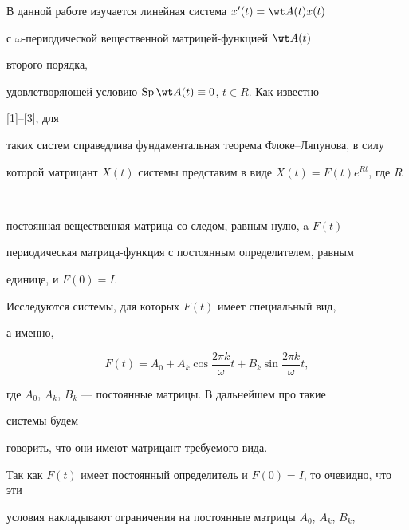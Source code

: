 

\maketitle 


\label{begin} 


 


 


 


В данной работе изучается линейная система $x'(t)=\wt A(t)x(t)$ 


с $\omega$-периодической вещественной мат\-ри\-цей-функцией $\wt A(t)$


второго порядка, 


удовлетворяющей условию $\SP\wt A(t)\equiv0$, $t\in R$. Как известно 


[1]--[3], для 


таких систем справедлива фундаментальная теорема Флоке--Ляпунова, в силу 


которой матрицант $X(t)$ системы представим в виде $X(t)=F(t)e^{Rt}$, где $R$ 


--- 


постоянная вещественная матрица со следом, равным нулю, a $F(t)$ --- 


периодическая матрица-функция с постоянным определителем, равным 


единице, и $F(0)=I$. 


 


Исследуются системы, для которых $F(t)$ имеет специальный вид, 


а именно, 


$$ 


F(t)=A_0+A_k\cos\frac{2\pi k}{\omega}t+ 


B_k\sin\frac{2\pi k}{\omega}t, 


$$ 


где $A_0$, $A_k$, $B_k$ --- постоянные матрицы. В дальнейшем про такие 


системы будем 


говорить, что они имеют матрицант требуемого вида. 


 


Так как $F(t)$ имеет постоянный определитель и $F(0)=I$, то очевидно, что эти 


условия накладывают ограничения на постоянные матрицы $A_0$, $A_k$, $B_k$, 


